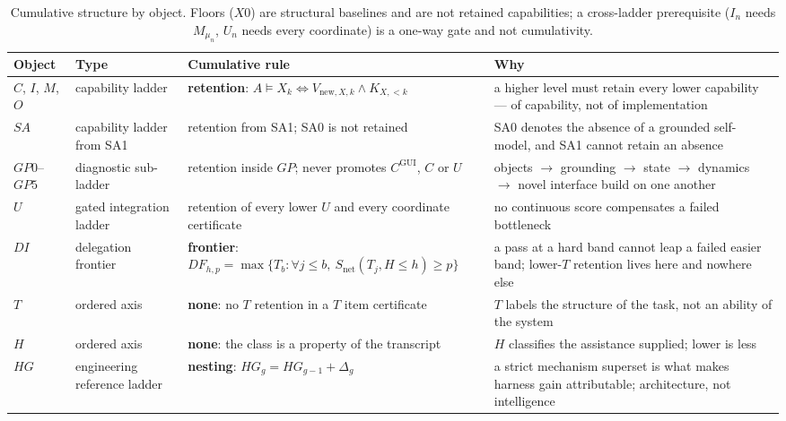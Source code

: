 \documentclass[11pt]{article}
\theoremstyle{definition}
\begin{document}
\begin{table}[!htbp]
\centering\small
\begin{tabularx}{\textwidth}{@{}llYY@{}}
\toprule
Object & Type & Cumulative rule & Why \\
\midrule
$C$, $I$, $M$, $O$ & capability ladder & \textbf{retention}: $A \models X_k \iff V_{\mathrm{new},X,k} \wedge K_{X,<k}$ & a higher level must retain every lower capability --- of capability, not of implementation \\
$SA$ & capability ladder from SA1 & retention from SA1; SA0 is not retained & SA0 denotes the absence of a grounded self-model, and SA1 cannot retain an absence \\
$GP0$--$GP5$ & diagnostic sub-ladder & retention inside $GP$; never promotes $C^{\mathrm{GUI}}$, $C$ or $U$ & objects $\to$ grounding $\to$ state $\to$ dynamics $\to$ novel interface build on one another \\
$U$ & gated integration ladder & retention of every lower $U$ and every coordinate certificate & no continuous score compensates a failed bottleneck \\
$DI$ & delegation frontier & \textbf{frontier}: $DF_{h,p} = \max\{T_b : \forall j \le b,\ S_{\mathrm{net}}(T_j, H \le h) \ge p\}$ & a pass at a hard band cannot leap a failed easier band; lower-$T$ retention lives here and nowhere else \\
$T$ & ordered axis & \textbf{none}: no $T$ retention in a $T$ item certificate & $T$ labels the structure of the task, not an ability of the system \\
$H$ & ordered axis & \textbf{none}: the class is a property of the transcript & $H$ classifies the assistance supplied; lower is less \\
$HG$ & engineering reference ladder & \textbf{nesting}: $HG_g = HG_{g-1} + \Delta_g$ & a strict mechanism superset is what makes harness gain attributable; architecture, not intelligence \\
\bottomrule
\end{tabularx}
\caption{Cumulative structure by object. Floors ($X0$) are structural baselines and are not retained capabilities; a cross-ladder prerequisite ($I_n$ needs $M_{\mu_n}$, $U_n$ needs every coordinate) is a one-way gate and not cumulativity.}
\label{tab:typed}
\end{table}
\end{document}
